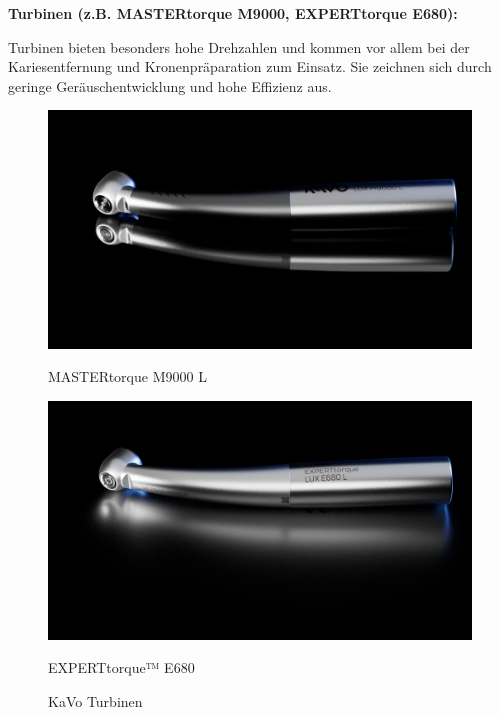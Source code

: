 \textbf{Turbinen (z.B. MASTERtorque M9000, EXPERTtorque E680):}

Turbinen bieten besonders hohe Drehzahlen und kommen vor allem bei der Kariesentfernung und Kronenpräparation zum Einsatz. Sie zeichnen sich durch geringe Geräuschentwicklung und hohe Effizienz aus.

\begin{figure}[H]
  \centering
  \begin{minipage}[b]{0.45\textwidth}
    \centering
    \includegraphics[width=\textwidth]{images/MASTERtorque-M9000-L_1-007-7100-black-cutout-3840px-2160px.jpg}
    \caption*{MASTERtorque M9000 L}
  \end{minipage}
  \hspace{0.05\textwidth}
  \begin{minipage}[b]{0.45\textwidth}
    \centering
    \includegraphics[width=\textwidth]{images/EXPERTtorque-LUX-Planmeca-E680L_1-015-0680-hb-v01-c-16-9-1920px-1080px.jpg}
    \caption*{EXPERTtorque™ E680}
  \end{minipage}
  \caption{KaVo Turbinen}
  \label{fig:Turbiene}
\end{figure}
\vspace{1em}

